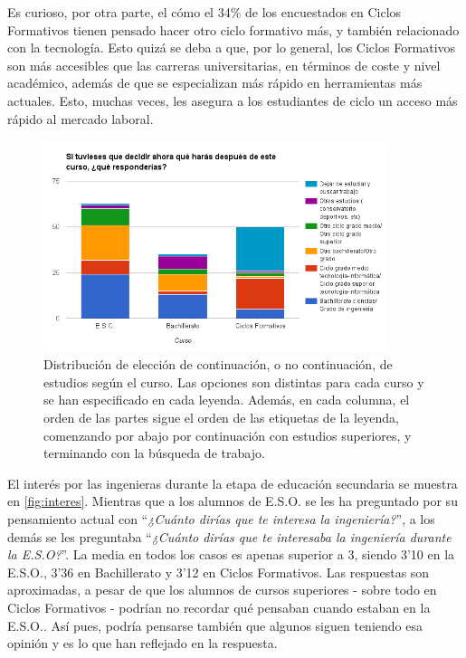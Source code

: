 \documentclass[runningheads,a4paper]{llncs}
\begin{document}
Es curioso, por otra parte, el cómo el 34\% de los encuestados en Ciclos Formativos tienen pensado hacer otro ciclo formativo más, y también relacionado con la tecnología. Esto quizá se deba a que, por lo general, los Ciclos Formativos son más accesibles que las carreras universitarias, en términos de coste y nivel académico, además de que se especializan más rápido en herramientas más actuales. Esto, muchas veces, les asegura a los estudiantes de ciclo un acceso más rápido al mercado laboral. 

\begin{figure}
  \begin{center}
    \includegraphics[width=0.9\textwidth]{Bitmap/eleccion.png}
    \caption{{\scriptsize Distribución de elección de continuación, o no continuación, de estudios según el curso. Las opciones son distintas para cada curso y se han especificado en cada leyenda. Además, en cada columna, el orden de las partes sigue el orden de las etiquetas de la leyenda, comenzando por abajo por continuación con estudios superiores, y terminando con la búsqueda de trabajo.}}
    \label{fig:eleccion}
  \end{center}
\end{figure}

El interés por las ingenieras durante la etapa de educación secundaria se muestra en \ref{fig:interes}. Mientras que a los alumnos de E.S.O. se les ha preguntado por su pensamiento actual con ``\textit{¿Cuánto dirías que te interesa la ingeniería?}'', a los demás se les preguntaba ``\textit{¿Cuánto dirías que te interesaba la ingeniería durante la E.S.O?}''. La media en todos los casos es apenas superior a 3, siendo 3'10 en la E.S.O., 3'36 en Bachillerato y 3'12 en Ciclos Formativos. Las respuestas son aproximadas, a pesar de que los alumnos de cursos superiores - sobre todo en Ciclos Formativos - podrían no recordar qué pensaban cuando estaban en la E.S.O.. Así pues, podría pensarse también que algunos siguen teniendo esa opinión y es lo que han reflejado en la respuesta.
\end{document}
